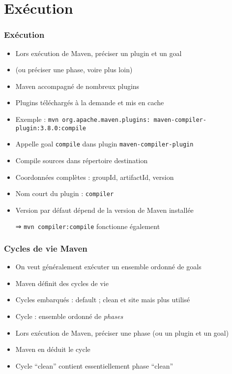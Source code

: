 \documentclass[english, french]{beamer}
\begin{document}
\section{Exécution}
\begin{frame}
	\frametitle{Exécution}
	\begin{itemize}
		\item Lors exécution de Maven, préciser un plugin et un goal
		\item (ou préciser une phase, voire plus loin)
		\item Maven accompagné de nombreux plugins
		\item Plugins téléchargés à la demande et mis en cache
		\item Exemple : \texttt{mvn org.apache.maven.plugins: maven-compiler-plugin:3.8.0:compile}
		\item Appelle goal \texttt{compile} dans plugin \texttt{maven-compiler-plugin}
		\item Compile sources dans répertoire destination
		\item Coordonnées complètes : groupId, artifactId, version
		\item Nom court du plugin : \texttt{compiler}
		\item Version par défaut dépend de la version de Maven installée
		\item[⇒] \texttt{mvn compiler:compile} fonctionne également
	\end{itemize}
\end{frame}

\begin{frame}
	\frametitle{Cycles de vie Maven}
	\begin{itemize}
		\item On veut généralement exécuter un ensemble ordonné de goals
		\item Maven définit des cycles de vie
		\item Cycles embarqués : default ; clean {\tiny et site mais plus utilisé}
		\item Cycle : ensemble ordonné de \emph{phases}
		\item Lors exécution de Maven, préciser une phase (ou un plugin et un goal)
		\item Maven en déduit le cycle
		\item Cycle “clean” contient {\tiny essentiellement} phase “clean”
	\end{itemize}
\end{frame}
\end{document}
